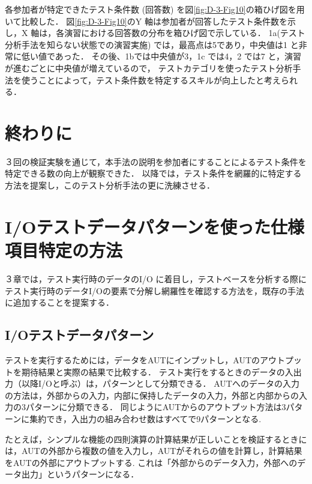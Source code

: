 \documentclass[a4paper,10pt]{jreport}
\begin{document}
各参加者が特定できたテスト条件数 (回答数) を図\ref{fig:D-3-Fig10}の箱ひげ図を用いて比較した．
図\ref{fig:D-3-Fig10}のY 軸は参加者が回答したテスト条件数を示し，X 軸は，各演習における回答数の分布を箱ひげ図で示している． 1a(テスト分析手法を知らない状態での演習実施) では，最高点は5であり，中央値は1 と非常に低い値であった．
その後、1bでは中央値が3，1c では4，2 では7 と，演習が進むごとに中央値が増えているので， テストカテゴリを使ったテスト分析手法を使うことによって，テスト条件数を特定するスキルが向上したと考えられる．
\section{終わりに}
３回の検証実験を通じて，本手法の説明を参加者にすることによるテスト条件を特定できる数の向上が観察できた．
以降では，テスト条件を網羅的に特定する方法を提案し，このテスト分析手法の更に洗練させる．


\section{I/Oテストデータパターンを使った仕様項目特定の方法}
３章では，テスト実行時のデータのI/O に着目し，テストベースを分析する際にテスト実行時のデータI/Oの要素で分解し網羅性を確認する方法を，既存の手法に追加することを提案する．

\subsection{I/Oテストデータパターン}

テストを実行するためには，データをAUTにインプットし，AUTのアウトプットを期待結果と実際の結果で比較する．
テスト実行をするときのデータの入出力（以降I/Oと呼ぶ）は，パターンとして分類できる．
AUTへのデータの入力の方法は，外部からの入力，内部に保持したデータの入力，外部と内部からの入力の3パターンに分類できる．
同じようにAUTからのアウトプット方法は3パターンに集約でき，入出力の組み合わせ数はすべてで9パターンとなる.

たとえば，シンプルな機能の四則演算の計算結果が正しいことを検証するときには，AUTの外部から複数の値を入力し，AUTがそれらの値を計算し，計算結果をAUTの外部にアウトプットする.
これは「外部からのデータ入力，外部へのデータ出力」というパターンになる．
\end{document}

